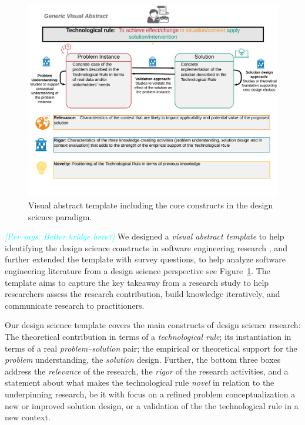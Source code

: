 \documentclass[graybox]{svmult}
\newcommand{\per}[1]{\textcolor{cyan}{{\it [Per says: #1]}}}
\newcommand{\per}[1]{}
\begin{document}
\begin{figure}[t]
  \includegraphics[width=1.0\textwidth]{Figures/GenericVA.png}
\caption{Visual abstract template including the core constructs in the design science paradigm.}
\label{fig:VA-template}       %
\end{figure}

\per{Better bridge here?}
We designed a \emph{visual abstract template} to help identifying the design science constructs in software engineering research \cite{StoreyESEM17}, and further extended the template with survey questions, to help analyze software engineering literature from a design science perspective \cite{Engstrom19arxiv} see Figure~\ref{fig:VA-template}. The template aims to capture the key takeaway from a research study to help researchers assess the research contribution, build knowledge iteratively, and communicate research to practitioners. %

Our design science template covers the main constructs of design science research: The theoretical contribution in terms of a \emph{technological rule}; its instantiation in terms of a real \emph{problem--solution} pair;  the empirical or theoretical support for the \emph{problem} understanding, the \emph{solution} design. Further, the bottom three boxes address the \emph{relevance} of the research, the \emph{rigor} of the research activities,  and a statement about what makes the technological rule \emph{novel} in relation to the underpinning research, be it with focus on a refined problem conceptualization a new or improved solution design, or a validation of the the technological rule in a new context. 
\end{document}
